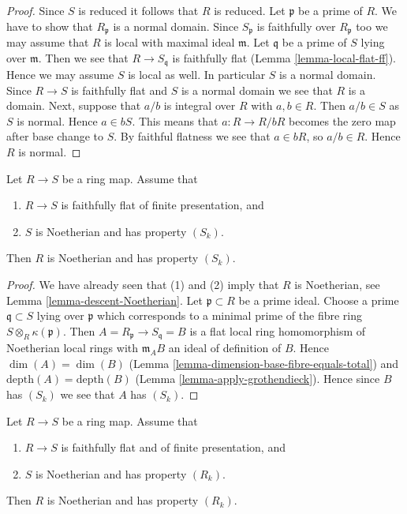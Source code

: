 \begin{proof}
Since $S$ is reduced it follows that $R$ is reduced.
Let $\mathfrak p$ be a prime of $R$. We have to show that
$R_{\mathfrak p}$ is a normal domain. Since $S_{\mathfrak p}$
is faithfully over $R_{\mathfrak p}$ too we may assume that
$R$ is local with maximal ideal $\mathfrak m$.
Let $\mathfrak q$ be a prime of $S$ lying over $\mathfrak m$.
Then we see that $R \to S_{\mathfrak q}$ is faithfully flat
(Lemma \ref{lemma-local-flat-ff}).
Hence we may assume $S$ is local as well.
In particular $S$ is a normal domain.
Since $R \to S$ is faithfully flat
and $S$ is a normal domain we see that $R$ is a domain.
Next, suppose that $a/b$ is integral over $R$ with $a, b \in R$.
Then $a/b \in S$ as $S$ is normal. Hence $a \in bS$.
This means that $a : R \to R/bR$ becomes the zero map
after base change to $S$. By faithful flatness we see that
$a \in bR$, so $a/b \in R$. Hence $R$ is normal.
\end{proof}

\begin{lemma}
\label{lemma-descent-Sk}
Let $R \to S$ be a ring map.
Assume that
\begin{enumerate}
\item $R \to S$ is faithfully flat of finite presentation, and
\item $S$ is Noetherian and has property $(S_k)$.
\end{enumerate}
Then $R$ is Noetherian and has property $(S_k)$.
\end{lemma}

\begin{proof}
We have already seen that (1) and (2) imply that $R$ is Noetherian,
see Lemma \ref{lemma-descent-Noetherian}.
Let $\mathfrak p \subset R$ be a prime ideal.
Choose a prime $\mathfrak q \subset S$ lying over $\mathfrak p$
which corresponds to a minimal prime of the fibre ring
$S \otimes_R \kappa(\mathfrak p)$. Then
$A = R_{\mathfrak p} \to S_{\mathfrak q} = B$ is a flat local ring
homomorphism of Noetherian local rings with $\mathfrak m_AB$ an
ideal of definition of $B$. Hence
$\dim(A) = \dim(B)$ (Lemma \ref{lemma-dimension-base-fibre-equals-total}) and
$\text{depth}(A) = \text{depth}(B)$ (Lemma \ref{lemma-apply-grothendieck}).
Hence since $B$ has $(S_k)$ we
see that $A$ has $(S_k)$.
\end{proof}

\begin{lemma}
\label{lemma-descent-Rk}
Let $R \to S$ be a ring map. Assume that
\begin{enumerate}
\item $R \to S$ is faithfully flat and of finite presentation, and
\item $S$ is Noetherian and has property $(R_k)$.
\end{enumerate}
Then $R$ is Noetherian and has property $(R_k)$.
\end{lemma}

